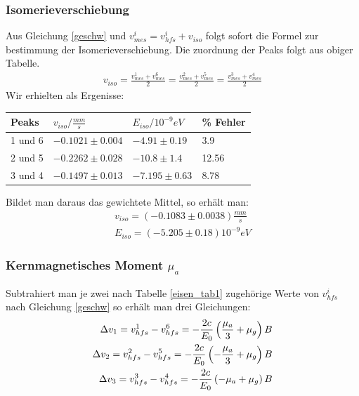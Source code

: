 \documentclass[12pt]{article}
\begin{document}
\subsubsection{Isomerieverschiebung}
Aus Gleichung \ref{geschw} und $v_{mes}^i = v_{hfs}^i + v_{iso}$ folgt sofort die Formel zur bestimmung der Isomerieverschiebung. Die zuordnung 
der Peaks folgt aus obiger Tabelle.
\begin{align*}
 v_{iso} = \frac{v_{mes}^1+v_{mes}^6}{2} =\frac{v_{mes}^2+v_{mes}^5}{2} =\frac{v_{mes}^3+v_{mes}^4}{2}
\end{align*}
Wir erhielten als Ergenisse: \\
\newline
\begin{center}
\begin{tabular}{|l|lll|}
\hline
Peaks & $v_{iso}/\frac{mm}{s}$ & $E_{iso}/10^{-9}eV$ & \% Fehler\\
\hline
1 und 6& $-0.1021 \pm 0.004$ & $-4.91 \pm 0.19$ & 3.9\\
2 und 5& $-0.2262 \pm 0.028$ & $-10.8 \pm 1.4$ & 12.56\\
3 und 4& $-0.1497 \pm 0.013$ & $-7.195 \pm 0.63$ & 8.78\\
\hline
\end{tabular}
\label{eisen_tabiso}
\end{center}

Bildet man daraus das gewichtete Mittel, so erhält man:
\begin{align*}
 v_{iso} = (-0.1083\pm 0.0038)\frac{mm}{s} \\
 E_{iso} = (-5.205 \pm 0.18)10^{-9} eV
\end{align*}

\subsubsection{Kernmagnetisches Moment $\mu_a$}
Subtrahiert man je zwei nach Tabelle \ref{eisen_tab1} zugehörige Werte von $v_{hfs}^i$ nach Gleichung \ref{geschw} so erhält man drei Gleichungen:
\begin{align}
 \notag \Delta v_1=v_{hfs}^1 - v_{hfs}^6 = -\frac{2c}{E_0} \left( \frac{\mu_a}{3} + \mu_g \right) B \\
 \Delta v_2=v_{hfs}^2 - v_{hfs}^5 = -\frac{2c}{E_0} \left( -\frac{\mu_a}{3} + \mu_g \right) B \\
 \notag \Delta v_3=v_{hfs}^3 - v_{hfs}^4 = -\frac{2c}{E_0} \left( -\mu_a + \mu_g \right) B 
\end{align}
\label{diff_geschw}
\end{document}
